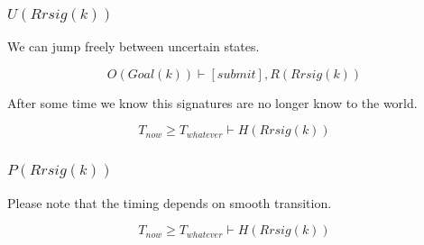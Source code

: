 \documentclass[twoside,english, a4paper]{article}
\newcommand{\highlightMinSig}[1]{\textcolor{MinSig}{\bf{#1}}}
\newcommand{\mathbox}[1]{#1}
\begin{document}
\subsubsection{$U(Rrsig(k))$}

\mathbox{

	We can jump freely between uncertain states.

	\begin{equation}
		O(Goal(k)) \vdash [submit], R(Rrsig(k))
	\end{equation}

	After some time we know this signatures are no longer know to the
	world.
	
	\begin{equation}
		T_{now} \geq T_{whatever} \vdash H(Rrsig(k))
	\end{equation}
}

\subsubsection{$P(Rrsig(k))$}

Please note that the timing depends on smooth transition.

\highlightMinSig{
	\begin{equation}
		T_{now} \geq T_{whatever} \vdash H(Rrsig(k))
	\end{equation}
}
\end{document}
